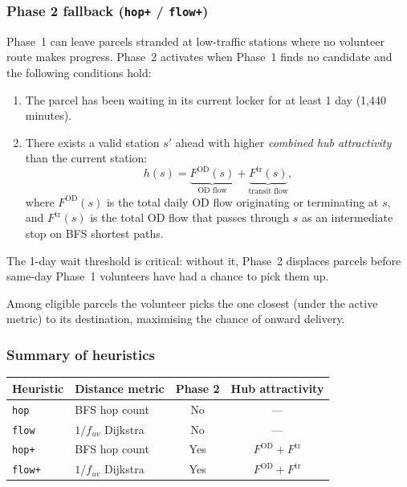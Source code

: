\documentclass[11pt,a4paper]{article}
\begin{document}
\subsubsection{Phase 2 fallback (\texttt{hop+} / \texttt{flow+})}

Phase~1 can leave parcels stranded at low-traffic stations where no volunteer
route makes progress. Phase~2 activates when Phase~1 finds no candidate and
the following conditions hold:
\begin{enumerate}
  \item The parcel has been waiting in its current locker for at least 1 day
        (1{,}440 minutes).
  \item There exists a valid station $s'$ ahead with higher \emph{combined hub
        attractivity} than the current station:
        \[
          h(s) = \underbrace{F^{\mathrm{OD}}(s)}_{\text{OD flow}} +
                 \underbrace{F^{\mathrm{tr}}(s)}_{\text{transit flow}},
        \]
        where $F^{\mathrm{OD}}(s)$ is the total daily OD flow originating or
        terminating at $s$, and $F^{\mathrm{tr}}(s)$ is the total OD flow
        that passes through $s$ as an intermediate stop on BFS shortest paths.
\end{enumerate}
The 1-day wait threshold is critical: without it, Phase~2 displaces parcels
before same-day Phase~1 volunteers have had a chance to pick them up.

Among eligible parcels the volunteer picks the one closest (under the active
metric) to its destination, maximising the chance of onward delivery.

\subsubsection{Summary of heuristics}

\begin{center}
\begin{tabular}{llcc}
\toprule
Heuristic & Distance metric & Phase 2 & Hub attractivity \\
\midrule
\texttt{hop}   & BFS hop count   & No  & --- \\
\texttt{flow}  & $1/f_{uv}$ Dijkstra & No  & --- \\
\texttt{hop+}  & BFS hop count   & Yes & $F^{\mathrm{OD}}+F^{\mathrm{tr}}$ \\
\texttt{flow+} & $1/f_{uv}$ Dijkstra & Yes & $F^{\mathrm{OD}}+F^{\mathrm{tr}}$ \\
\bottomrule
\end{tabular}
\end{center}
\end{document}
